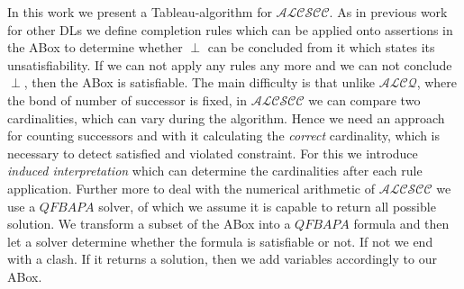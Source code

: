 \documentclass{book}
\theoremstyle{break}
\theoremstyle{definition}
\begin{document}
In this work we present a Tableau-algorithm for $\mathcal{ALCSCC}$. As in previous work for other DLs we define completion rules which can be applied onto assertions in the ABox to determine whether $\perp$ can be concluded from it which states its unsatisfiability. If we can not apply any rules any more and we can not conclude $\perp$, then the ABox is satisfiable. The main difficulty is that unlike $\mathcal{ALCQ}$, where the bond of number of successor is fixed, in $\mathcal{ALCSCC}$ we can compare two cardinalities, which can vary during the algorithm. Hence we need an approach for counting successors and with it calculating the \textit{correct} cardinality, which is necessary to detect satisfied and violated constraint. For this we introduce \textit{induced interpretation} which can determine the cardinalities after each rule application. Further more to deal with the numerical arithmetic of $\mathcal{ALCSCC}$ we use a $QFBAPA$ solver, of which we assume it is capable to return all possible solution. We transform a subset of the ABox into a $QFBAPA$ formula and then let a solver determine whether the formula is satisfiable or not. If not we end with a clash. If it returns a solution, then we add variables accordingly to our ABox. 
\end{document}
